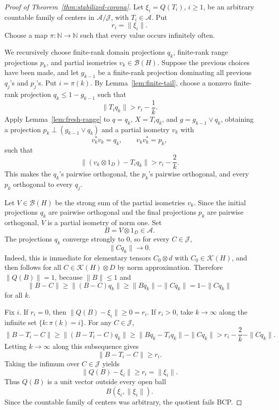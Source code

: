 \documentclass[11pt]{article}
\newcommand{\B}{\mathcal B}
\newcommand{\K}{\mathcal K}
\begin{document}
\begin{proof}[Proof of Theorem~\ref{thm:stabilized-corona}]
Let \(\xi_i=Q(T_i)\), \(i\ge1\), be an arbitrary countable family of centers
in \(\mathcal A/\mathcal J\), with \(T_i\in\mathcal A\).  Put
\[
        r_i=\|\xi_i\|.
\]
Choose a map \(\pi:\mathbb N\to\mathbb N\) such that every value occurs
infinitely often.

We recursively choose finite-rank domain projections \(q_k\), finite-rank
range projections \(p_k\), and partial isometries \(v_k\in\B(H)\).  Suppose the
previous choices have been made, and let \(g_{k-1}\) be a finite-rank
projection dominating all previous \(q_j\)'s and \(p_j\)'s.  Put
\(i=\pi(k)\).  By Lemma~\ref{lem:finite-tail}, choose a nonzero finite-rank
projection \(q_k\le1-g_{k-1}\) such that
\[
        \|T_iq_k\|>r_i-\frac1k.
\]
Apply Lemma~\ref{lem:fresh-range} to \(q=q_k\), \(X=T_iq_k\), and
\(g=g_{k-1}\vee q_k\), obtaining a projection \(p_k\perp(g_{k-1}\vee q_k)\)
and a partial isometry \(v_k\) with
\[
        v_k^*v_k=q_k,\qquad v_kv_k^*=p_k,
\]
such that
\[
        \|(v_k\otimes1_D)-T_iq_k\|>r_i-\frac2k.
\]
This makes the \(q_k\)'s pairwise orthogonal, the \(p_k\)'s pairwise
orthogonal, and every \(p_k\) orthogonal to every \(q_j\).

Let \(V\in\B(H)\) be the strong sum of the partial isometries \(v_k\).  Since
the initial projections \(q_k\) are pairwise orthogonal and the final
projections \(p_k\) are pairwise orthogonal, \(V\) is a partial isometry of
norm one.  Set
\[
        B=V\otimes1_D\in\mathcal A.
\]
The projections \(q_k\) converge strongly to \(0\), so for every
\(C\in\mathcal J\),
\[
        \|Cq_k\|\longrightarrow0.
\]
Indeed, this is immediate for elementary tensors \(C_0\otimes d\) with
\(C_0\in\K(H)\), and then follows for all \(C\in\K(H)\otimes D\) by norm
approximation.
Therefore \(\|Q(B)\|=1\), because \(\|B\|\le1\) and
\[
        \|B-C\|\ge \|(B-C)q_k\|\ge \|Bq_k\|-\|Cq_k\|
        =1-\|Cq_k\|
\]
for all \(k\).

Fix \(i\).  If \(r_i=0\), then \(\|Q(B)-\xi_i\|\ge0=r_i\).  If \(r_i>0\),
take \(k\to\infty\) along the infinite set \(\{k:\pi(k)=i\}\).  For any
\(C\in\mathcal J\),
\[
        \|B-T_i-C\|
        \ge
        \|(B-T_i-C)q_k\|
        \ge
        \|Bq_k-T_iq_k\|-\|Cq_k\|
        >
        r_i-\frac2k-\|Cq_k\|.
\]
Letting \(k\to\infty\) along this subsequence gives
\[
        \|B-T_i-C\|\ge r_i.
\]
Taking the infimum over \(C\in\mathcal J\) yields
\[
        \|Q(B)-\xi_i\|\ge r_i=\|\xi_i\|.
\]
Thus \(Q(B)\) is a unit vector outside every open ball
\[
        B(\xi_i,\|\xi_i\|).
\]
Since the countable family of centers was arbitrary, the quotient fails BCP.
\end{proof}
\end{document}
